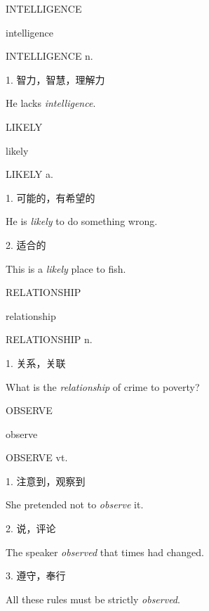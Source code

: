 \begin{flashcard}{
INTELLIGENCE

intelligence
}
\begin{center}
INTELLIGENCE n. 
\end{center}
1. 智力，智慧，理解力

He lacks \textit{intelligence}.

\end{flashcard}
\begin{flashcard}{
LIKELY

likely
}
\begin{center}
LIKELY a. 
\end{center}
1. 可能的，有希望的

He is \textit{likely} to do something wrong.

2. 适合的

This is a \textit{likely} place to fish.

\end{flashcard}
\begin{flashcard}{
RELATIONSHIP

relationship
}
\begin{center}
RELATIONSHIP n. 
\end{center}
1. 关系，关联

What is the \textit{relationship} of crime to poverty?

\end{flashcard}
\begin{flashcard}{
OBSERVE

observe
}
\begin{center}
OBSERVE vt. 
\end{center}
1. 注意到，观察到

She pretended not to \textit{observe} it.

2. 说，评论

The speaker \textit{observed} that times had changed.

3. 遵守，奉行

All these rules must be strictly \textit{observed}.

\end{flashcard}
